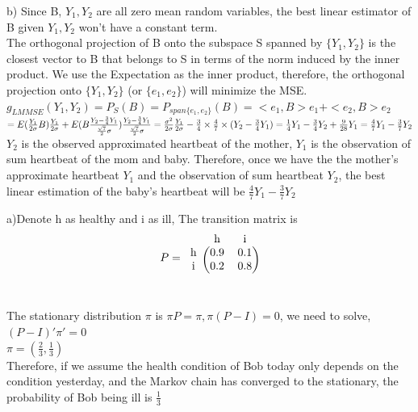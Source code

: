 \documentclass[11pt]{article}
\newenvironment{problem}[2][Problem]{\begin{trivlist}
\item[\hskip \labelsep {\bfseries #1}\hskip \labelsep {\bfseries #2.}]}{\end{trivlist}}
\begin{document}
b) Since B, $Y_1, Y_2$ are all zero mean random variables, the best linear estimator of B given $Y_1, Y_2$ won't have a constant term. \\
The orthogonal projection of B onto the subspace S spanned by $\{Y_1,Y_2\}$ is the closest vector to B that belongs to S in terms of the norm induced by the inner product. We use the Expectation as the inner product, therefore, the orthogonal projection onto $\{Y_1,Y_2\}$ (or $\{e_1,e_2\}$) will minimize the MSE.\\
$g_{LMMSE}(Y_1,Y_2) =P_S(B) = P_{span\{e_1,e_2\}}(B) = <e_1,B>e_1+ <e_2,B>e_2$\\
$= E(\frac{Y_1}{2\sigma}B)\frac{Y_1}{2\sigma} +E(B\frac{Y_2 - \frac{3}{4}Y_1}{\frac{\sqrt{7}}{2}\sigma})\frac{Y_2 - \frac{3}{4}Y_1}{\frac{\sqrt{7}}{2}\sigma} \\
= \frac{\sigma^2}{2\sigma} \frac{Y_1}{2\sigma}- \frac{3}{4}\times \frac{4}{7} \times(Y_2 - \frac{3}{4}Y_1)\\
= \frac{1}{4}Y_1 - \frac{3}{4}Y_2 + \frac{9}{28}Y_1\\ = \frac{4}{7}Y_1 - \frac{3}{7}Y_2$\\

$Y_2$ is the observed approximated heartbeat of the mother, $Y_1$ is the observation of sum heartbeat of the mom and baby. Therefore, once we have the  the mother's approximate heartbeat $Y_1$ and the observation of sum heartbeat $Y_2$, the best linear estimation of the baby's heartbeat will be $\frac{4}{7}Y_1 - \frac{3}{7}Y_2$\\
\pagebreak

 \begin{problem}{3}
 \end{problem}
a)Denote h as healthy and i as ill, The transition matrix is  \[P = 
\begin{blockarray}{ccc}
&\text{h} & \text{i}\\
\begin{block}{c(cc)}
\text{h} & 0.9  &0.1 \\
\text{i}  & 0.2 &0.8 \\
\end{block}
\end{blockarray}
\]\\ The stationary distribution $\pi$ is $\pi P = \pi, \pi(P-I)=0$, we need to solve, $(P-I)'\pi' = 0$\\
$\pi =  (\frac{2}{3},\frac{1}{3})$\\
Therefore, if we assume the health condition of Bob today only depends on the condition yesterday, and the Markov chain has converged to the stationary,  the probability of Bob being ill is $\frac{1}{3}$\\
\end{document}
